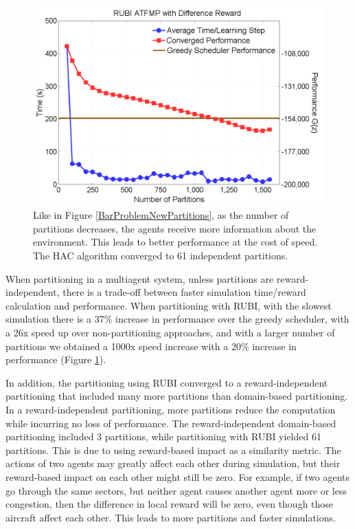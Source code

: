 \documentclass[smallcondensed]{svjour3}
\begin{document}
\begin{figure}
\centering
\includegraphics[width=.75\columnwidth]{ATFMPComparisonNoScale}
\caption{Like in Figure \ref{BarProblemNewPartitions}, as the number of partitions decreases, the agents receive more information about the environment. This leads to better performance at the cost of speed. The HAC algorithm converged to 61 independent partitions.}
\label{ATFMPComparisonNoScale}
\end{figure}

When partitioning in a multiagent system, unless partitions are reward-independent, there is a trade-off between faster simulation time/reward calculation and performance. When partitioning with RUBI, with the slowest simulation there is a 37\% increase in performance over the greedy scheduler, with a 26x speed up over non-partitioning approaches, and with a larger number of partitions we obtained a 1000x speed increase with a 20\% increase in performance (Figure \ref{ATFMPComparisonNoScale}).

In addition, the partitioning using RUBI converged to a reward-independent partitioning that included many more partitions than domain-based partitioning. In a reward-independent partitioning, more partitions reduce the computation while incurring no loss of performance. The reward-independent domain-based partitioning included 3 partitions, while partitioning with RUBI yielded 61 partitions. This is due to using reward-based impact as a similarity metric. The actions of two agents may greatly affect each other during simulation, but their reward-based impact on each other might still be zero. For example, if two agents go through the same sectors, but neither agent causes another agent more or less congestion, then the difference in local reward will be zero, even though those aircraft affect each other. This leads to more partitions and faster simulations. %
\end{document}
